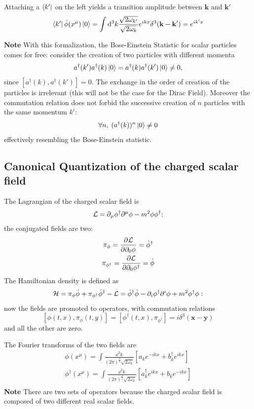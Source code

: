 Attaching a $\bra{k'}$ on the left yields a transition
amplitude between $\mathbf{k}$ and $\mathbf{k'}$ 
$$\bra{k'}\hat\phi(x^\mu)\ket{0} = \int \dd^3k \frac{\sqrt{2\omega_{k'}}}
{\sqrt{2\omega_k}}e^{ikx}\delta^3(\mathbf{k-k'}) = e^{ik'x}$$

\textbf{Note} With this formalization, the Bose-Einstein Statistic for scalar
particles comes for free: consider the creation of two particles with different
momenta
$$a^\dagger(k')a^\dagger(k)\ket{0} = a^\dagger(k)a^\dagger(k')\ket{0}\neq0,$$
since $\left[a^\dagger(k),a^\dagger(k')\right] = 0$. The exchange in the
order of creation of the particles is irrelevant (this will not be the case
for the Dirac Field). Moreover the commutation relation does not forbid the
successive creation of $n$ particles with the same momentum $k^i$:
$$\forall n,\; (a^\dagger(k))^n\ket{0}\neq0$$
effectively resembling the Bose-Einstein statistic.
\subsection{Canonical Quantization of the charged scalar field}
The Lagrangian of the charged scalar field is
$$\mathcal{L}=\partial_\mu\phi^\dagger\partial^\mu\phi - m^2\phi\phi^\dagger;$$
the conjugated fields are two:
\begin{gather*}
    \pi_\phi= \pdv[]{\mathcal{L}}{\partial_0\phi} = {\dot \phi}^\dagger\\
    \pi_{\phi^\dagger}= \pdv{\mathcal{L}}{\partial_0\phi^\dagger} ={\dot \phi}
\end{gather*}
The Hamiltonian density is defined as
$$\mathcal{H}=\pi_\phi\dot\phi + \pi_{\phi^\dagger}\dot\phi^\dagger -\mathcal{L}=
\dot\phi^\dagger\dot\phi - \partial_i\phi^\dagger\partial^i\phi + m^2\phi^\dagger\phi:$$
now the fields are promoted to operators, with commutation relations
$$\left[\phi(t,x),\pi_\phi(t,y)\right]=\left[\phi^\dagger(t,x),\pi_{\phi^\dagger}
\right]=i\delta^3(\mathbf{x-y})$$
and all the other are zero.

The Fourier transforms of the two fields are
\begin{gather*}
    \phi(x^\mu) = \int \frac{\dd^3k}{(2\pi)^{\frac{3}{2}}\sqrt{2\omega_k}}
    \left[a_ke^{-ikx}+b^\dagger_k e^{ikx}\right]\\
    \phi^\dagger(x^\mu) = \int \frac{\dd^3k}{(2\pi)^{\frac{3}{2}}\sqrt{2\omega_k}}
    \left[a^\dagger_ke^{ikx}+b_k e^{-ikx}\right]\\
\end{gather*}
\textbf{Note} There are two sets of operators because the charged scalar field
is composed of two different real scalar fields.

